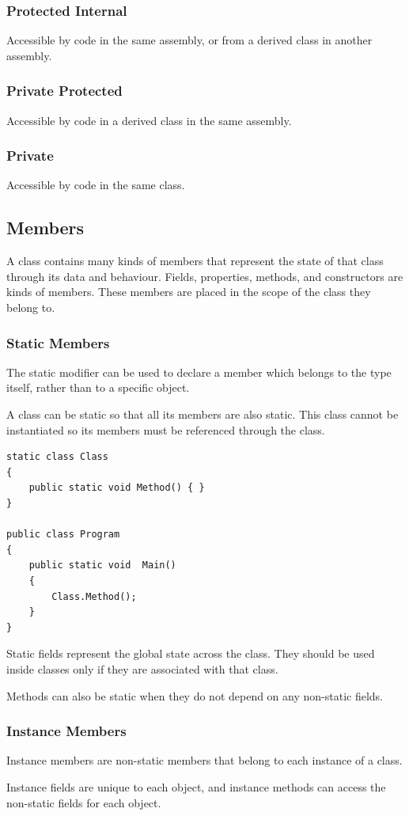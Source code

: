 \documentclass{article}
\begin{document}
\subsubsection{Protected Internal}
Accessible by code in the same assembly, or from a derived class in another assembly.
\subsubsection{Private Protected}
Accessible by code in a derived class in the same assembly.
\subsubsection{Private}
Accessible by code in the same class.
\subsection{Members}
A class contains many kinds of members that represent the state of that class through its data and behaviour.
Fields, properties, methods, and constructors are kinds of members.
These members are placed in the scope of the class they belong to.
\subsubsection{Static Members}
The static modifier can be used to declare a member which belongs to the type itself,
rather than to a specific object.

A class can be static so that all its members are also static. This class cannot be
instantiated so its members must be referenced through the class.
\begin{lstlisting}
static class Class 
{
    public static void Method() { }
}

public class Program 
{
    public static void  Main() 
    {
        Class.Method();
    } 
}
\end{lstlisting}
Static fields represent the global state across the class.
They should be used inside classes only if they are associated with that class.

Methods can also be static when they do not depend on any non-static fields.
\subsubsection{Instance Members}
Instance members are non-static members that belong to each instance of a class.

Instance fields are unique to each object, and instance methods can access the
non-static fields for each object.
\end{document}
